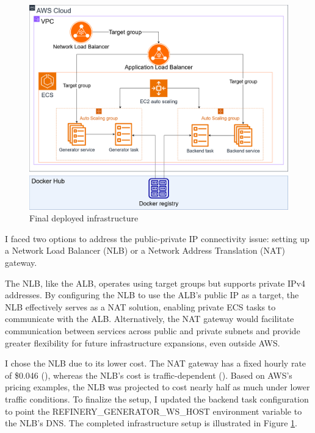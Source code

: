 		\begin{figure}[h!]
			\begin{center}
				\includegraphics[scale=0.35]{include/imgs/final_aws_infra.png}
				\caption{Final deployed infrastructure}
				\label{infrafinal}
			\end{center}
		\end{figure}

		I faced two options to address the public-private IP connectivity issue: setting up a Network Load Balancer (NLB) or a Network Address Translation (NAT) gateway.

		The NLB, like the ALB, operates using target groups but supports private IPv4 addresses. 
		By configuring the NLB to use the ALB’s public IP as a target, the NLB effectively serves as a NAT solution, enabling private ECS tasks to communicate with the ALB. 
		Alternatively, the NAT gateway would facilitate communication between services across public and private subnets and provide greater flexibility 
		for future infrastructure expansions, even outside AWS.

		I chose the NLB due to its lower cost. The NAT gateway has a fixed hourly rate of \$0.046 (\cite{natprice}), whereas the NLB’s cost is traffic-dependent (\cite{nlbprice}). 
		Based on AWS’s pricing examples, the NLB was projected to cost nearly half as much under lower traffic conditions. 
		To finalize the setup, I updated the backend task configuration to point the REFINERY\_GENERATOR\_WS\_HOST environment variable to the NLB's DNS. 
		The completed infrastructure setup is illustrated in Figure \ref{infrafinal}.